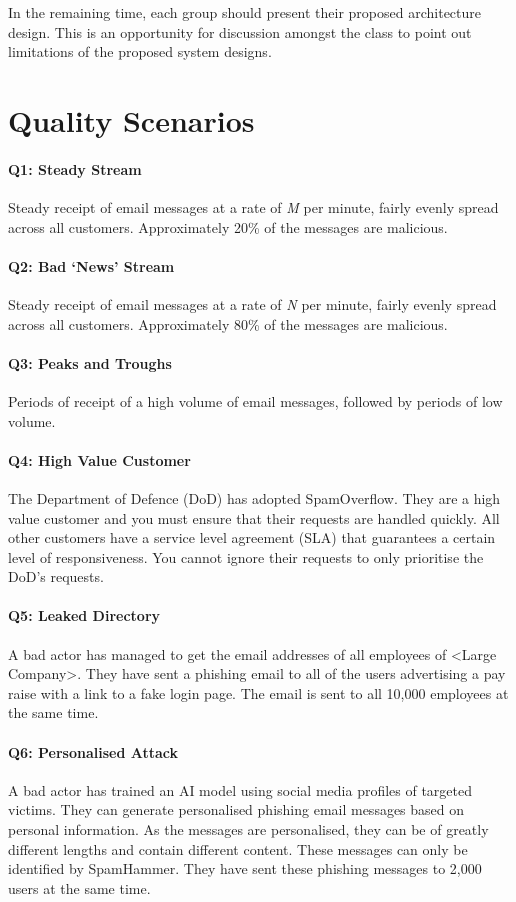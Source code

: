 \documentclass{csse4400}
\begin{document}
In the remaining time,
each group should present their proposed architecture design.
This is an opportunity for discussion amongst the class to point out limitations of the proposed system designs.


\section{Quality Scenarios}\label{sec:scenarios}

\paragraph{Q1: Steady Stream}
Steady receipt of email messages at a rate of \emph{M} per minute, fairly evenly spread across all customers.
Approximately 20\% of the messages are malicious.

\paragraph{Q2: Bad `News' Stream}
Steady receipt of email messages at a rate of \emph{N} per minute, fairly evenly spread across all customers.
Approximately 80\% of the messages are malicious.

\paragraph{Q3: Peaks and Troughs}
Periods of receipt of a high volume of email messages, followed by periods of low volume.

\paragraph{Q4: High Value Customer}
The Department of Defence (DoD) has adopted SpamOverflow.
They are a high value customer and you must ensure that their requests are handled quickly.
All other customers have a service level agreement (SLA) that guarantees a certain level of responsiveness.
You cannot ignore their requests to only prioritise the DoD's requests.

\paragraph{Q5: Leaked Directory}
A bad actor has managed to get the email addresses of all employees of <Large Company>.
They have sent a phishing email to all of the users advertising a pay raise with a link to a fake login page.
The email is sent to all 10,000 employees at the same time.

\paragraph{Q6: Personalised Attack}
A bad actor has trained an AI model using social media profiles of targeted victims.
They can generate personalised phishing email messages based on personal information.
As the messages are personalised, they can be of greatly different lengths and contain different content.
These messages can only be identified by SpamHammer.
They have sent these phishing messages to 2,000 users at the same time.
\end{document}
